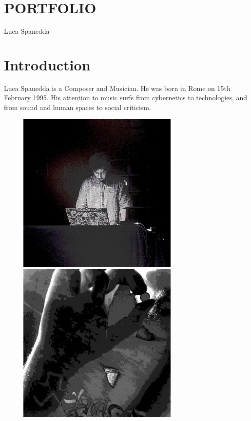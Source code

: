\documentclass[12pt,landscape]{article}
\begin{document}
\LARGE
\color{white}
{\tt
\begin{center}


\section*{PORTFOLIO}
Luca Spanedda
\clearpage


\section*{Introduction}

Luca Spanedda is a Composer and Musician.
\newline
He was born in Rome on 15th February 1995.
\newline
His attention to music surfs from cybernetics to technologies,
\newline
and from sound and human spaces to social criticism.

\begin{figure}[!htb]
  \includegraphics[width=8cm]{portfolio1.jpg}

\endminipage\hfill
{}
  \includegraphics[width=8cm]{portfolio2.jpg}


\end{figure}
\end{center}}
\end{document}
